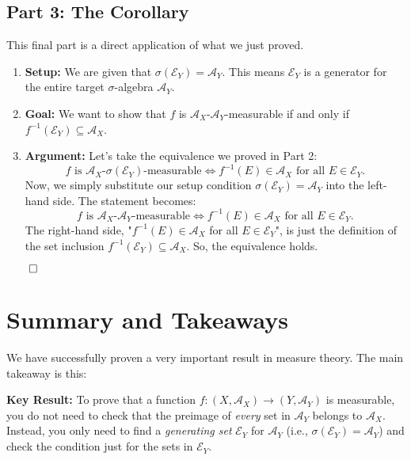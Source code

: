 \documentclass[11pt,a4paper]{article}
\theoremstyle{exercise_style}
\theoremstyle{definition}
\begin{document}
\subsection{Part 3: The Corollary}
This final part is a direct application of what we just proved.
\begin{enumerate}
    \item \textbf{Setup:} We are given that $\sigma(\mathcal{E}_Y) = \mathcal{A}_Y$. This means $\mathcal{E}_Y$ is a generator for the entire target $\sigma$-algebra $\mathcal{A}_Y$.
    \item \textbf{Goal:} We want to show that $f$ is $\mathcal{A}_X$-$\mathcal{A}_Y$-measurable if and only if $f^{-1}(\mathcal{E}_Y) \subseteq \mathcal{A}_X$.
    \item \textbf{Argument:} Let's take the equivalence we proved in Part 2:
    \[
        f \text{ is } \mathcal{A}_X\text{-}\sigma(\mathcal{E}_Y)\text{-measurable} \iff f^{-1}(E) \in \mathcal{A}_X \text{ for all } E \in \mathcal{E}_Y.
    \]
    Now, we simply substitute our setup condition $\sigma(\mathcal{E}_Y) = \mathcal{A}_Y$ into the left-hand side. The statement becomes:
    \[
        f \text{ is } \mathcal{A}_X\text{-}\mathcal{A}_Y\text{-measurable} \iff f^{-1}(E) \in \mathcal{A}_X \text{ for all } E \in \mathcal{E}_Y.
    \]
    The right-hand side, "$f^{-1}(E) \in \mathcal{A}_X$ for all $E \in \mathcal{E}_Y$", is just the definition of the set inclusion $f^{-1}(\mathcal{E}_Y) \subseteq \mathcal{A}_X$.
    So, the equivalence holds.
\end{enumerate}
\hfill $\qed$

\section{Summary and Takeaways}

We have successfully proven a very important result in measure theory. The main takeaway is this:

\begin{center}
\parbox{0.8\textwidth}{%
\textbf{Key Result:} To prove that a function $f: (X, \mathcal{A}_X) \to (Y, \mathcal{A}_Y)$ is measurable, you do not need to check that the preimage of \textit{every} set in $\mathcal{A}_Y$ belongs to $\mathcal{A}_X$. Instead, you only need to find a \textit{generating set} $\mathcal{E}_Y$ for $\mathcal{A}_Y$ (i.e., $\sigma(\mathcal{E}_Y) = \mathcal{A}_Y$) and check the condition just for the sets in $\mathcal{E}_Y$.
}
\end{center}
\end{document}

